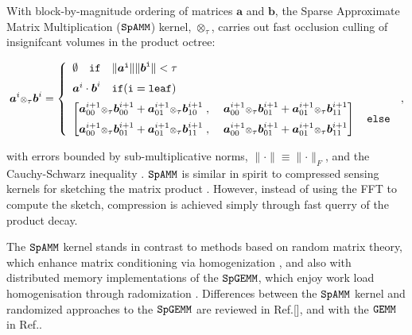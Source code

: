 \documentclass[letterpaper,twocolumn,amsmath,amsfont,amssymb,english,aps,jcp,preprintnumbers,groupaddress,nofootinbib,tightenlines]{revtex4}
\newcommand{\mat}[1]{\boldsymbol{#1}}
\newcommand{\ot}{ {\scriptstyle \otimes}_{ \tau } }
\begin{document}
With block-by-magnitude ordering of matrices $\mat{a}$ and $\mat{b}$, 
the Sparse Approximate Matrix Multiplication ($\tt SpAMM$) kernel,  $\ot$, carries out fast 
occlusion culling of insignifcant volumes in the product octree:
\begin{widetext}
\begin{equation}
\mat{a}^{i} \ot \mat{b}^{i} = 
\left\{
        \begin{array}{ll}
                 \emptyset \quad \tt{if}\quad \lVert \mat{a}^i \rVert \lVert \mat{b}^i \rVert < \tau \\[0.2cm]
                 \mat{a} ^i \cdot \mat{b}^i \quad  \tt{if}(i=\tt{leaf}) \\[0.2cm]
\begin{bmatrix} \mat{a}^{i+1}_{00} \ot \mat{b}^{i+1}_{00} +\mat{a}^{i+1}_{01} \ot \mat{b}^{i+1}_{10} \; , \; &
                \mat{a}^{i+1}_{00} \ot \mat{b}^{i+1}_{01} +\mat{a}^{i+1}_{01} \ot \mat{b}^{i+1}_{11}  \\[0.2cm] 
                \mat{a}^{i+1}_{00} \ot \mat{b}^{i+1}_{01} +\mat{a}^{i+1}_{01} \ot \mat{b}^{i+1}_{11} \; , \; & 
                \mat{a}^{i+1}_{00} \ot \mat{b}^{i+1}_{01} +\mat{a}^{i+1}_{01} \ot \mat{b}^{i+1}_{11}   
\end{bmatrix}  \quad \tt{else}
                \end{array}
              \right.  \, ,
\end{equation}
\end{widetext}
with errors bounded by sub-multiplicative norms, $\lVert \cdot \rVert \equiv \lVert \cdot \rVert_F$, and the Cauchy-Schwarz inequality \cite{kahan}.
$\tt SpAMM$ is similar in spirit to compressed sensing kernels for sketching the matrix product \cite{Kutzkov2012, Pagh2013}.  However, 
instead of using the FFT to compute the sketch, compression is achieved simply through fast querry of the product decay.

The $\tt SpAMM$ kernel stands in contrast to methods based on random matrix theory, which enhance matrix conditioning via 
homogenization \cite{pan, DiahLi and Parket Scott}, and also with distributed memory implementations of the $\tt SpGEMM$, which 
enjoy work load homogenisation through radomization \cite{}.  Differences between the $\tt SpAMM$ kernel and randomized 
approaches to the $\tt SpGEMM$ are reviewed in Ref.[\cite{}], and with the $\tt GEMM$ in Ref.\cite{}.
\end{document}
